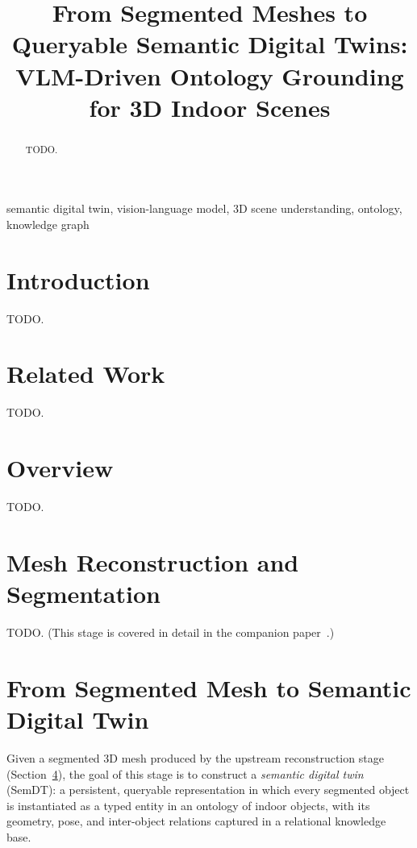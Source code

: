 \documentclass[conference]{IEEEtran}
\begin{document}
\title{From Segmented Meshes to Queryable Semantic Digital Twins:\\
VLM-Driven Ontology Grounding for 3D Indoor Scenes}

\author{
}

\maketitle

\begin{abstract}
TODO.
\end{abstract}

\begin{IEEEkeywords}
semantic digital twin, vision-language model, 3D scene understanding, ontology, knowledge graph
\end{IEEEkeywords}

\section{Introduction}
TODO.

\section{Related Work}
TODO.

\section{Overview}
TODO.

\section{Mesh Reconstruction and Segmentation}
\label{sec:recon}
TODO. (This stage is covered in detail in the companion paper~\cite{semdt_stage1}.)

\section{From Segmented Mesh to Semantic Digital Twin}
\label{sec:pipeline}

Given a segmented 3D mesh produced by the upstream reconstruction stage
(Section~\ref{sec:recon}), the goal of this stage is to construct a
\emph{semantic digital twin} (SemDT): a persistent, queryable
representation in which every segmented object is instantiated as a typed
entity in an ontology of indoor objects, with its geometry, pose, and
inter-object relations captured in a relational knowledge base.
\end{document}
